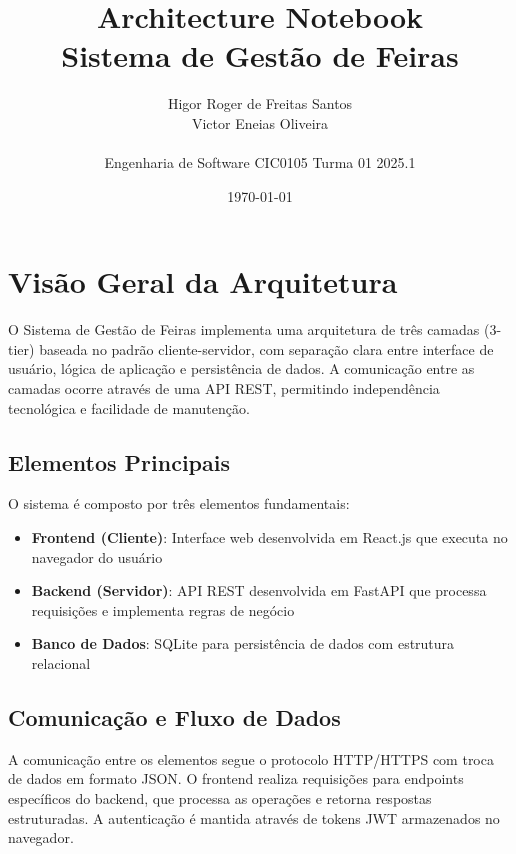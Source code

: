 \documentclass[12pt,a4paper]{article}
\title{\textbf{Architecture Notebook}\\
\large Sistema de Gestão de Feiras}
\author{Higor Roger de Freitas Santos \quad 221006440\\
Victor Eneias Oliveira \quad 221038364\\
\\
Engenharia de Software CIC0105 Turma 01 2025.1}
\date{\today}
\begin{document}
\maketitle

\tableofcontents
\newpage

\section{Visão Geral da Arquitetura}

O Sistema de Gestão de Feiras implementa uma arquitetura de três camadas (3-tier) baseada no padrão cliente-servidor, com separação clara entre interface de usuário, lógica de aplicação e persistência de dados. A comunicação entre as camadas ocorre através de uma API REST, permitindo independência tecnológica e facilidade de manutenção.

\subsection{Elementos Principais}

O sistema é composto por três elementos fundamentais:

\begin{itemize}
    \item \textbf{Frontend (Cliente)}: Interface web desenvolvida em React.js que executa no navegador do usuário
    \item \textbf{Backend (Servidor)}: API REST desenvolvida em FastAPI que processa requisições e implementa regras de negócio
    \item \textbf{Banco de Dados}: SQLite para persistência de dados com estrutura relacional
\end{itemize}

\subsection{Comunicação e Fluxo de Dados}

A comunicação entre os elementos segue o protocolo HTTP/HTTPS com troca de dados em formato JSON. O frontend realiza requisições para endpoints específicos do backend, que processa as operações e retorna respostas estruturadas. A autenticação é mantida através de tokens JWT armazenados no navegador.
\end{document}
